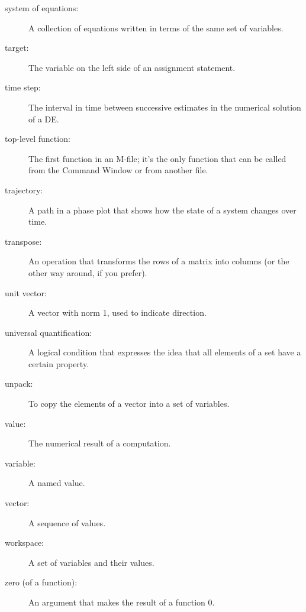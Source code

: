 \begin{description}
\item[system of equations:] A collection of equations written in terms of
the same set of variables.

\item[target:] The variable on the left side of an assignment statement.

\item[time step:] The interval in time between successive estimates
in the numerical solution of a DE.

\item[top-level function:]  The first function in an M-file;
it's the only function that can be called from the Command
Window or from another file.


\item[trajectory:] A path in a phase plot that shows how the state of
a system changes over time.

\item[transpose:] An operation that transforms the rows of a matrix
into columns (or the other way around, if you prefer).

\item[unit vector:] A vector with norm 1, used to indicate
direction.

\item[universal quantification:] A logical condition that expresses
the idea that all elements of a set have a certain property.

\item[unpack:] To copy the elements of a vector into a set of variables.

\item[value:] The numerical result of a computation.

\item[variable:] A named value.

\item[vector:] A sequence of values.

\item[workspace:] A set of variables and their values.

\item[zero (of a function):] An argument that makes the result of a function $0$.

\end{description}


